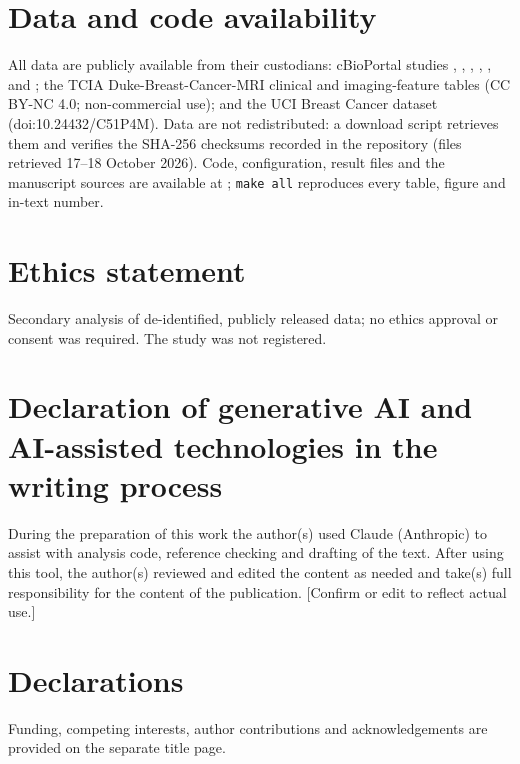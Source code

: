 \section*{Data and code availability}
All data are publicly available from their custodians: cBioPortal studies ,
, , , ,
 and ; the TCIA Duke-Breast-Cancer-MRI clinical and
imaging-feature tables (CC BY-NC 4.0; non-commercial use); and the UCI Breast Cancer dataset
(doi:10.24432/C51P4M). Data are not redistributed: a download script retrieves them and verifies the
SHA-256 checksums recorded in the repository (files retrieved 17--18 October 2026). Code, configuration,
result files and the manuscript sources are available at \CodeURL; \texttt{make all} reproduces every
table, figure and in-text number.

\section*{Ethics statement}
Secondary analysis of de-identified, publicly released data; no ethics approval or consent was
required. The study was not registered.

\section*{Declaration of generative AI and AI-assisted technologies in the writing process}
During the preparation of this work the author(s) used Claude (Anthropic) to assist with analysis code,
reference checking and drafting of the text. After using this tool, the author(s) reviewed and edited
the content as needed and take(s) full responsibility for the content of the publication. [Confirm or
edit to reflect actual use.]

\ifanon
\section*{Declarations}
Funding, competing interests, author contributions and acknowledgements are provided on the separate
title page.
\else
{}
\fi
